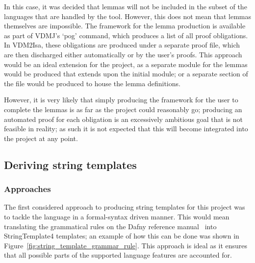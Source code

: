\documentclass{entcs}
\newcommand{\awcomment}[1]{\ifthenelse { \boolean{showComments} } {\textcolor{blue}{AW:~#1}} { } } %
\newcommand{\lfcomment}[1]{\ifthenelse { \boolean{showComments} } {\textcolor{red}{LF:~#1}} { } } %
\begin{document}
In this case, it was decided that lemmas will not be included in the subset of the languages that are handled by the tool. However, this does not mean that lemmas themselves are impossible. The framework for the lemma production is available as part of VDMJ's `pog' command, which produces a list of all proof obligations. In VDM2Isa, these obligations are produced under a separate proof file, which are then discharged either automatically or by the user's proofs. This approach would be an ideal extension for the project, as a separate module for the lemmas would be produced that extends upon the initial module; or a separate section of the file would be produced to house the lemma definitions.

However, it is very likely that simply producing the framework for the user to complete the lemmas is as far as the project could reasonably go; producing an automated proof for each obligation is an excessively ambitious goal that is not feasible in reality; as such it is not expected that this will become integrated into the project at any point.

\subsection{Deriving string templates}

\subsubsection{Approaches}\label{section:templating_approaches}

The first considered approach to producing string templates for this project was to tackle the language in a formal-syntax driven manner. This would mean translating the grammatical rules on the Dafny reference manual~\cite{DfyGrammar} into StringTemplate4 templates; an example of how this can be done was shown in Figure~\ref{fig:string_template_grammar_rule}. This approach is ideal as it ensures that all possible parts of the supported language features are accounted for. 
\end{document}
